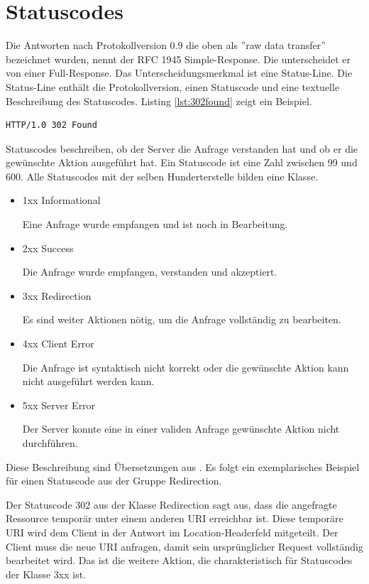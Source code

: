 \documentclass{llncs}
\begin{document}
\section{Statuscodes}
Die Antworten nach Protokollversion 0.9 die oben als ''raw data transfer'' bezeichnet wurden, nennt der RFC 1945 Simple-Response. Die unterscheidet er von einer Full-Response. Das Unterscheidungsmerkmal ist eine Status-Line. Die Status-Line enthält die Protokollversion, einen Statuscode und eine textuelle Beschreibung des Statuscodes. Listing \ref{lst:302found} zeigt ein Beispiel.

\begin{lstlisting}[caption={Statuscode 302},label={lst:302found}]
HTTP/1.0 302 Found
\end{lstlisting}

Statuscodes beschreiben, ob der Server die Anfrage verstanden hat und ob er die gewünschte Aktion ausgeführt hat. Ein Statuscode ist eine Zahl zwischen 99 und 600. Alle Statuscodes mit der selben Hunderterstelle bilden eine Klasse.

\begin{itemize}
\item 1xx Informational

Eine Anfrage wurde empfangen und ist noch in Bearbeitung.
\item 2xx Success

Die Anfrage wurde empfangen, verstanden und akzeptiert.
\item 3xx Redirection

Es sind weiter Aktionen nötig, um die Anfrage vollständig zu bearbeiten.
\item 4xx Client Error

Die Anfrage ist syntaktisch nicht korrekt oder die gewünschte Aktion kann nicht ausgeführt werden kann.
\item 5xx Server Error

Der Server konnte eine in einer validen Anfrage gewünschte Aktion nicht durchführen.
\end{itemize}

Diese Beschreibung sind Übersetzungen aus \cite{Fiellding1999}. Es folgt ein exemplarisches Beispiel für einen Statuscode aus der Gruppe Redirection.


Der Statuscode 302 aus der Klasse Redirection sagt aus, dass die angefragte Ressource temporär unter einem anderen URI erreichbar ist. Diese temporäre URI wird dem Client in der Antwort im Location-Headerfeld mitgeteilt. Der Client muss die neue URI anfragen, damit sein ursprünglicher Request vollständig bearbeitet wird. Das ist die weitere Aktion, die charakteristisch für Statuscodes der Klasse 3xx ist. 
   
\end{document}
